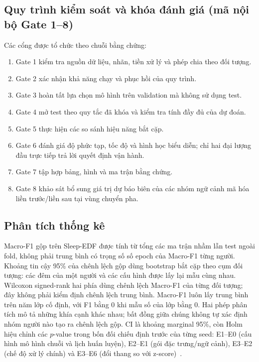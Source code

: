 \subsection{Quy trình kiểm soát và khóa đánh giá (mã nội bộ Gate 1--8)}

Các cổng được tổ chức theo chuỗi bằng chứng:

\begin{enumerate}
  \item Gate 1 kiểm tra nguồn dữ liệu, nhãn, tiền xử lý và phép chia theo đối tượng.
  \item Gate 2 xác nhận khả năng chạy và phục hồi của quy trình.
  \item Gate 3 hoàn tất lựa chọn mô hình trên validation mà không sử dụng test.
  \item Gate 4 mở test theo quy tắc đã khóa và kiểm tra tính đầy đủ của dự đoán.
  \item Gate 5 thực hiện các so sánh hiệu năng bắt cặp.
  \item Gate 6 đánh giá độ phức tạp, tốc độ và hình học biểu diễn; chỉ hai đại lượng đầu trực tiếp trả lời quyết định vận hành.
  \item Gate 7 tập hợp bảng, hình và ma trận bằng chứng.
  \item Gate 8 khảo sát bổ sung giá trị dự báo biên của các nhóm ngữ cảnh mã hóa liền trước/liền sau tại vùng chuyển pha.
\end{enumerate}

\subsection{Phân tích thống kê}

Macro-F1 gộp trên Sleep-EDF được tính từ tổng các ma trận nhầm lẫn test ngoài fold, không phải trung bình có trọng số số epoch của Macro-F1 từng người. Khoảng tin cậy 95\% của chênh lệch gộp dùng bootstrap bắt cặp theo cụm đối tượng: các đêm của một người và các cấu hình được lấy lại mẫu cùng nhau. Wilcoxon signed-rank hai phía dùng chênh lệch Macro-F1 của từng đối tượng; đây không phải kiểm định chênh lệch trung bình. Macro-F1 luôn lấy trung bình trên năm lớp cố định, với F1 bằng 0 khi mẫu số của lớp bằng 0. Hai phép phân tích mô tả những khía cạnh khác nhau; bất đồng giữa chúng không tự xác định nhóm người nào tạo ra chênh lệch gộp. CI là khoảng marginal 95\%, còn Holm hiệu chỉnh các $p$-value trong bốn đối chiếu định trước của từng seed: E1--E0 (cấu hình mô hình chuỗi và lịch huấn luyện), E2--E1 (gói đặc trưng/ngữ cảnh), E3--E2 (chế độ xử lý chính) và E3--E6 (đổi thang so với z-score)~\cite{efron1994bootstrap,wilcoxon1945,holm1979}.

